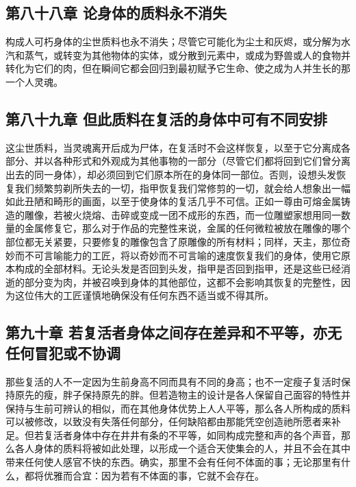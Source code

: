 
\subsection{第八十八章 论身体的质料永不消失}

构成人可朽身体的尘世质料也永不消失；尽管它可能化为尘土和灰烬，或分解为水汽和蒸气，或转变为其他物体的实体，或分散到元素中，或成为野兽或人的食物并转化为它们的肉，但在瞬间它都会回归到最初赋予它生命、使之成为人并生长的那一个人灵魂。\par


\subsection{第八十九章 但此质料在复活的身体中可有不同安排}

这尘世质料，当灵魂离开后成为尸体，在复活时不会这样恢复，以至于它分离成各部分、并以各种形式和外观成为其他事物的一部分（尽管它们都将回到它们曾分离出去的同一身体），却必须回到它们原本所在的身体同一部位。否则，设想头发恢复我们频繁剪剃所失去的一切，指甲恢复我们常修剪的一切，就会给人想象出一幅如此丑陋和畸形的画面，以至于使身体的复活几乎不可信。正如一尊由可熔金属铸造的雕像，若被火烧熔、击碎或变成一团不成形的东西，而一位雕塑家想用同一数量的金属修复它，那么对于作品的完整性来说，金属的任何微粒被放在雕像的哪个部位都无关紧要，只要修复的雕像包含了原雕像的所有材料；同样，天主，那位奇妙而不可言喻能力的工匠，将以奇妙而不可言喻的速度恢复我们的身体，使用它原本构成的全部材料。无论头发是否回到头发，指甲是否回到指甲，还是这些已经消逝的部分变为肉，并被召唤到身体的其他部位，这都不会影响其恢复的完整性，因为这位伟大的工匠谨慎地确保没有任何东西不适当或不得其所。\par


\subsection{第九十章 若复活者身体之间存在差异和不平等，亦无任何冒犯或不协调}

那些复活的人不一定因为生前身高不同而具有不同的身高；也不一定瘦子复活时保持原先的瘦，胖子保持原先的胖。但若造物主的设计是各人保留自己面容的特性并保持与生前可辨认的相似，而在其他身体优势上人人平等，那么各人所构成的质料可以被修改，以致没有失落任何部分，任何缺陷都由那能凭空创造祂所愿者来补足。但若复活者身体中存在井井有条的不平等，如同构成完整和声的各个声音，那么各人身体的质料将被如此处理，以形成一个适合天使集会的人，并且不会在其中带来任何使人感官不快的东西。确实，那里不会有任何不体面的事；无论那里有什么，都将优雅而合宜：因为若有不体面的事，它就不会存在。\par

